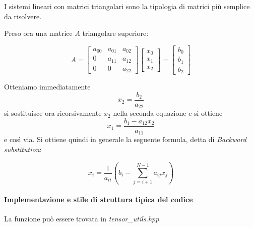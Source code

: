 I sistemi lineari con matrici triangolari sono la tipologia di matrici più semplice da risolvere.

Preso ora una matrice $A$ triangolare superiore:

$$
	A = \begin{bmatrix}
		a_{00} & a_{01} & a_{02} \\
		0      & a_{11} & a_{12} \\
		0      & 0      & a_{22}
	\end{bmatrix} \begin{bmatrix}
		x_0 \\ x_1 \\ x_2 \end{bmatrix} = \begin{bmatrix}
		b_0 \\ b_1 \\ b_2 \end{bmatrix}
$$

Otteniamo immediatamente $$x_2 = \frac{b_2}{a_{22}}$$ si sostituisce ora ricorsivamente
$x_2$ nella seconda equazione e si ottiene $$x_1 = \frac{b_1 - a_{12}x_2}{a_{11}}$$ e
così via. Si ottiene quindi in generale la seguente formula, detta di \textit{Backward substitution}:

$$
	x_i = \frac{1}{a_{ii}} ( b_i - \sum_{j=i+1}^{N-1} a_{ij}x_j )
$$

\paragraph{Implementazione e stile di struttura tipica del codice}

La funzione può essere trovata in \textit{tensor\_utils.hpp}.



